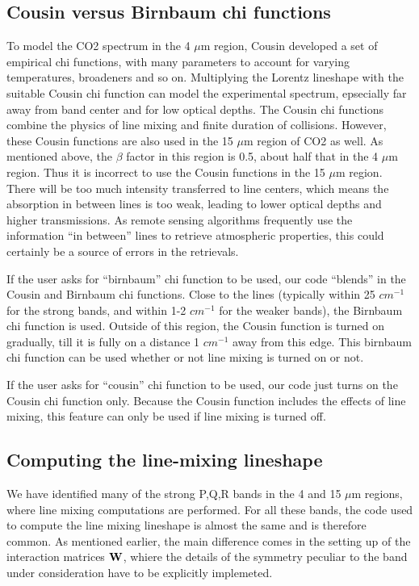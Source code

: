 \documentclass[11pt]{article}
\begin{document}
\subsection{Cousin versus Birnbaum chi functions}
To model the CO2 spectrum in the 4 $\mu$m region, Cousin developed a set of
empirical chi functions, with many parameters to account for varying
temperatures, broadeners and so on. Multiplying the Lorentz lineshape
with the suitable Cousin chi function can model the experimental spectrum,
epsecially far away from band center and for low optical depths. The Cousin
chi functions combine the physics of line mixing and finite duration of 
collisions. However, these Cousin functions are also used in the 15 $\mu$m
region of CO2 as well. As mentioned above, the $\beta$ factor in this region
is 0.5, about half that in the 4 $\mu$m region. Thus it is incorrect to use
the Cousin functions in the 15 $\mu$m region. There will be too much 
intensity transferred to line centers, which means the absorption in 
between lines is too weak, leading to lower optical depths and higher 
transmissions. As remote sensing algorithms frequently use the information
``in between'' lines to retrieve atmospheric properties, this could 
certainly be a source of errors in the retrievals.

If the user asks for ``birnbaum'' chi function to be used, our code 
``blends'' in the Cousin and Birnbaum chi functions. Close to the 
lines (typically within 25 $cm^{-1}$ for the strong bands, and 
within 1-2 $cm^{-1}$ for the weaker bands), the Birnbaum chi function is 
used. Outside of this region, the Cousin function is turned on gradually, 
till it is fully on a distance 1 $cm^{-1}$ away from this edge. This 
birnbaum chi function can be used whether or not line mixing is turned 
on or not.

If the user asks for ``cousin'' chi function to be used, our code just 
turns on the Cousin chi function only. Because the Cousin function includes
the effects of line mixing, this feature can only be used if line mixing is 
turned off.

\subsection{Computing the line-mixing lineshape}

We have identified many of the strong P,Q,R bands in the 4 and 15 $\mu$m 
regions, where line mixing computations are performed. For all these bands, 
the code used to compute the line mixing lineshape is almost the same and
is therefore common. As mentioned earlier, the main difference comes in the
setting up of the interaction matrices ${\bf W}$, whiere the details of the
symmetry peculiar to the band under consideration have to be explicitly
implemeted.
\end{document}
